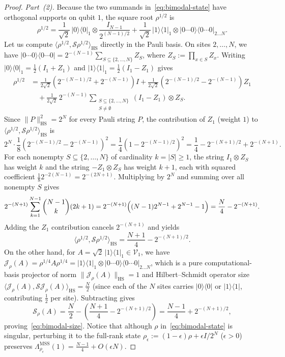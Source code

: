 \documentclass[11pt,a4paper]{article}
\numberwithin{equation}{section}
\theoremstyle{plain}
\theoremstyle{definition}
\newcommand{\HS}{\mathrm{HS}}
\newcommand{\MSS}{\mathrm{MSS}}
\begin{document}
\begin{proof}
\emph{Part~(2).} Because the two summands in~\eqref{eq:bimodal-state} have orthogonal supports on qubit $1$, the square root $\rho^{1/2}$ is
\[
  \rho^{1/2} = \frac{1}{\sqrt{2}}\,|0\rangle\langle 0|_1 \otimes \frac{I_{N-1}}{2^{(N-1)/2}}
             + \frac{1}{\sqrt{2}}\,|1\rangle\langle 1|_1 \otimes |0\cdots 0\rangle\langle 0\cdots 0|_{2\dots N}.
\]
Let us compute $\langle\rho^{1/2},\mathcal{S}\rho^{1/2}\rangle_\HS$ directly in the Pauli basis. On sites $2,\dots,N$, we have $|0\cdots 0\rangle\langle 0\cdots 0| = 2^{-(N-1)}\sum_{S\subseteq\{2,\dots,N\}} Z_S$, where $Z_S := \prod_{x\in S} Z_x$. Writing $|0\rangle\langle 0|_1 = \frac{1}{2}(I_1+Z_1)$ and $|1\rangle\langle 1|_1 = \frac{1}{2}(I_1-Z_1)$ gives
\begin{align*}
  \rho^{1/2}
  &= \frac{1}{2\sqrt{2}}\left(2^{-(N-1)/2} + 2^{-(N-1)}\right) I
   + \frac{1}{2\sqrt{2}}\left(2^{-(N-1)/2} - 2^{-(N-1)}\right) Z_1 \\
  &\quad + \frac{1}{2\sqrt{2}}\,2^{-(N-1)}\sum_{\substack{S\subseteq\{2,\dots,N\} \\ S\ne\emptyset}} (I_1 - Z_1)\otimes Z_S.
\end{align*}
Since $\|P\|_\HS^2 = 2^N$ for every Pauli string $P$, the contribution of $Z_1$ (weight $1$) to $\langle\rho^{1/2},\mathcal{S}\rho^{1/2}\rangle_\HS$ is
\[
  2^N\cdot \frac{1}{8}\left(2^{-(N-1)/2} - 2^{-(N-1)}\right)^2
  = \frac{1}{4}\left(1 - 2^{-(N-1)/2}\right)^2
  = \frac{1}{4} - 2^{-(N+1)/2} + 2^{-(N+1)}.
\]
For each nonempty $S\subseteq\{2,\dots,N\}$ of cardinality $k = |S|\ge 1$, the string $I_1\otimes Z_S$ has weight $k$ and the string $-Z_1\otimes Z_S$ has weight $k+1$, each with squared coefficient $\frac{1}{8}2^{-2(N-1)} = 2^{-(2N+1)}$. Multiplying by $2^N$ and summing over all nonempty $S$ gives
\[
  2^{-(N+1)}\sum_{k=1}^{N-1}\binom{N-1}{k}(2k+1)
  = 2^{-(N+1)}\Bigl((N-1)2^{N-1} + 2^{N-1} - 1\Bigr)
  = \frac{N}{4} - 2^{-(N+1)}.
\]
Adding the $Z_1$ contribution cancels $2^{-(N+1)}$ and yields
\[
  \langle\rho^{1/2},\mathcal{S}\rho^{1/2}\rangle_\HS = \frac{N+1}{4} - 2^{-(N+1)/2}.
\]
On the other hand, for $A = \sqrt{2}\,|1\rangle\langle 1|_1 \in \mathcal{V}_1$, we have $\mathcal{J}_\rho(A) = \rho^{1/4}A\rho^{1/4} = |1\rangle\langle 1|_1 \otimes |0\cdots 0\rangle\langle 0\cdots 0|_{2\dots N}$, which is a pure computational-basis projector of norm $\|\mathcal{J}_\rho(A)\|_\HS = 1$ and Hilbert--Schmidt operator size $\langle\mathcal{J}_\rho(A),\mathcal{S}\mathcal{J}_\rho(A)\rangle_\HS = \frac{N}{2}$ (since each of the $N$ sites carries $|0\rangle\langle 0|$ or $|1\rangle\langle 1|$, contributing $\frac{1}{2}$ per site). Subtracting gives
\[
  \mathcal{S}_\rho(A) = \frac{N}{2} - \left(\frac{N+1}{4} - 2^{-(N+1)/2}\right) = \frac{N-1}{4} + 2^{-(N+1)/2},
\]
proving~\eqref{eq:bimodal-size}. Notice that although $\rho$ in~\eqref{eq:bimodal-state} is singular, perturbing it to the full-rank state $\rho_\epsilon := (1-\epsilon)\rho + \epsilon I/2^N$ ($\epsilon > 0$) preserves $\Lambda_{\rho_\epsilon}^{\MSS}(1) = \frac{N-1}{4} + O(\epsilon N)$.


\end{proof}
\end{document}
